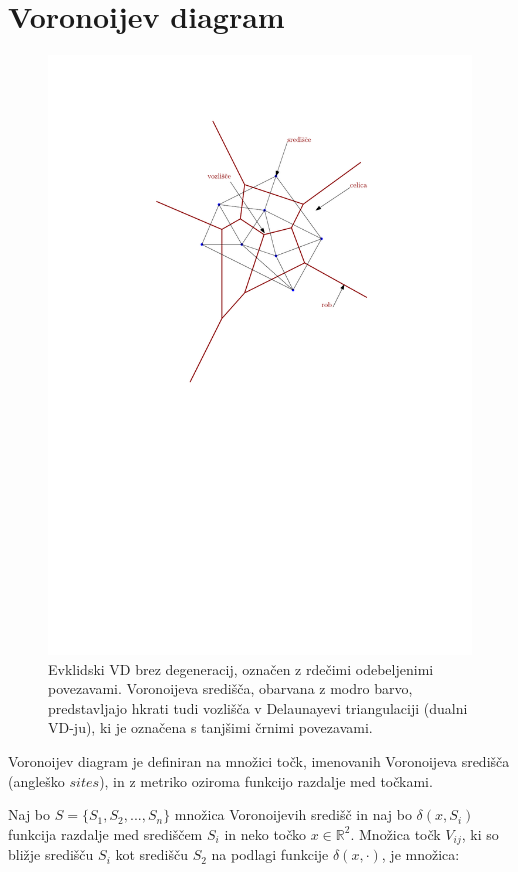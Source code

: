 \documentclass[a4paper, 12pt]{book}
\begin{document}
\section{Voronoijev diagram}
\begin{figure}
\centerline{\includegraphics[scale=0.8]{pics/voronoi-dt2.pdf}}
\caption{Evklidski VD brez degeneracij, označen z rdečimi odebeljenimi povezavami. Voronoijeva središča, obarvana z modro barvo, predstavljajo hkrati tudi vozlišča v Delaunayevi triangulaciji (dualni VD-ju), ki je označena s tanjšimi črnimi povezavami.}
\label{vd}
\end{figure}

Voronoijev diagram je definiran na množici točk, imenovanih Voronoijeva središča (angleško $sites$), in z metriko oziroma funkcijo razdalje med točkami.

Naj bo $S = \{S_1,S_2,...,S_n\}$ množica Voronoijevih središč in naj bo $\delta(x,S_i)$ funkcija razdalje med središčem $S_i$ in neko točko $x \in \mathbb{R}^2$. Množica točk $V_{ij}$, ki so bližje središču $S_i$ kot središču $S_2$ na podlagi funkcije $\delta(x,\cdot)$, je množica:
\end{document}
